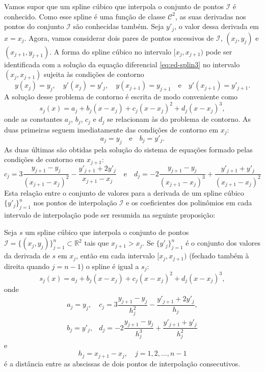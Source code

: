 Vamos supor que um spline cúbico que interpola o conjunto de pontos $\mathcal{I}$ é conhecido. Como esse spline é uma função de classe $\mathcal{C}^2$, as suas derivadas nos pontos do conjunto $\mathcal{I}$  são conhecidas também. Seja $y'_j$, o valor dessa derivada em $x=x_j$. Agora, vamos considerar dois pares de pontos sucessivos de $\mathcal{I}$,  $(x_j,y_j)$ e $(x_{j+1},y_{j+1})$. A forma do spline cúbico no intervalo $[x_j,x_{j+1})$ pode ser identificada com a solução da equação diferencial \eqref{eq:ed-splin3} no intervalo $(x_j,x_{j+1})$ sujeita às condições de contorno
\begin{equation}
y(x_j)=y_j,\quad y'(x_j)=y'_j,\quad y(x_{j+1})=y_{j+1}\quad\text{e}\quad y'(x_{j+1})=y'_{j+1}.
\end{equation}
A solução desse problema de contorno é escrita de modo conveniente como
\begin{equation}
s_j(x)=a_j+b_j(x-x_j)+c_j(x-x_j)^2+d_j(x-x_j)^3,
\end{equation}
onde as constantes $a_j$, $b_j$, $c_j$ e $d_j$ se relacionam às do problema de contorno.  As duas primeiras seguem imediatamente das condições de contorno em $x_j$:
\begin{equation}
a_j=y_j\quad\text{e}\quad b_j=y'_j.
\end{equation}
As duas últimas são obtidas pela solução do sistema de equações formado pelas condições de contorno em $x_{j+1}$:
\begin{equation}
c_j=3\frac{y_{j+1}-y_j}{\left(x_{j+1}-x_j\right)^2}-\frac{y'_{j+1}+2y'_j}{x_{j+1}-x_j} \quad\text{e}\quad d_j=-2\frac{y_{j+1}-y_j}{\left(x_{j+1}-x_j\right)^3}+\frac{y'_{j+1}+y'_j}{\left(x_{j+1}-x_j\right)^2}
\end{equation}
Esta relação entre o conjunto de valores para a derivada de um spline cúbico $\{y'_j\}_{j=1}^{n}$ nos pontos de interpolação $\mathcal{I}$ e os coeficientes dos polinômios em cada intervalo de interpolação pode ser resumida na seguinte proposição:
\begin{prop}
	Seja $s$ um spline cúbico que interpola o conjunto de pontos $\mathcal{I}=\{(x_j,y_j)\}_{j=1}^n\subset\mathbb{R}^2$ tais que $x_{j+1}>x_j$. Se $\{y'_j\}_{j=1}^n$ é o conjunto dos valores da derivada de $s$ em $x_j$, então em cada intervalo $[x_j,x_{j+1})$ (fechado também à direita quando $j=n-1$) o spline é igual a $s_j$:
	\begin{equation}\label{eq:spline3}
	s_j(x)=a_j+b_j(x-x_j)+c_j(x-x_j)^2+d_j(x-x_j)^3,
	\end{equation}
	onde
	\begin{equation}
	\begin{array}{ll}\label{eq:spline3-coef}
		a_j=y_j,&c_j=3\dfrac{y_{j+1}-y_j}{h_j^2}-\dfrac{y'_{j+1}+2y'_j}{h_j},\\
		b_j=y'_j,&d_j=-2\dfrac{y_{j+1}-y_j}{h_j^3}+\dfrac{y'_{j+1}+y'_j}{h_j^2}
	\end{array}
	\end{equation}
	e
	\begin{equation}\label{eq:espacamento}
		h_j=x_{j+1}-x_j,\quad j=1,2,\ldots,n-1
	\end{equation}
	é a distância entre as abscissas de dois pontos de interpolação consecutivos.
\end{prop}
